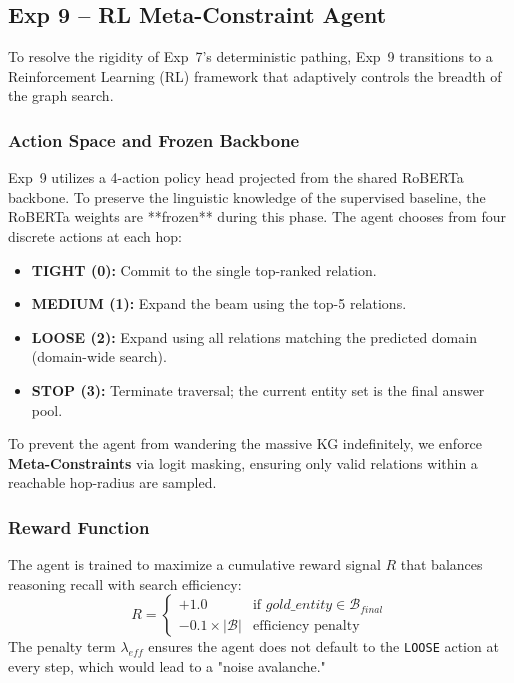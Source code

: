 \documentclass[11pt,a4paper]{article}
\begin{document}
\subsection{Exp 9 -- RL Meta-Constraint Agent}
\label{sec:exp9}

To resolve the rigidity of Exp~7's deterministic pathing, Exp~9 transitions
to a Reinforcement Learning (RL) framework that adaptively controls the
breadth of the graph search.

\subsubsection{Action Space and Frozen Backbone}
Exp~9 utilizes a 4-action policy head projected from the shared RoBERTa
backbone. To preserve the linguistic knowledge of the supervised baseline,
the RoBERTa weights are **frozen** during this phase. The agent chooses from
four discrete actions at each hop:
\begin{itemize}
    \item \textbf{TIGHT (0):} Commit to the single top-ranked relation.
    \item \textbf{MEDIUM (1):} Expand the beam using the top-5 relations.
    \item \textbf{LOOSE (2):} Expand using all relations matching the
          predicted domain (domain-wide search).
    \item \textbf{STOP (3):} Terminate traversal; the current entity set is
          the final answer pool.
\end{itemize}
To prevent the agent from wandering the massive KG indefinitely, we enforce
\textbf{Meta-Constraints} via logit masking, ensuring only valid relations
within a reachable hop-radius are sampled.

\subsubsection{Reward Function}
The agent is trained to maximize a cumulative reward signal $R$ that
balances reasoning recall with search efficiency:
\begin{equation}
    R = \begin{cases} 
        +1.0 & \text{if } gold\_entity \in \mathcal{B}_{final} \\
        -0.1 \times |\mathcal{B}| & \text{efficiency penalty}
    \end{cases}
\end{equation}
The penalty term $\lambda_{eff}$ ensures the agent does not default to the
\texttt{LOOSE} action at every step, which would lead to a "noise avalanche."
\end{document}
